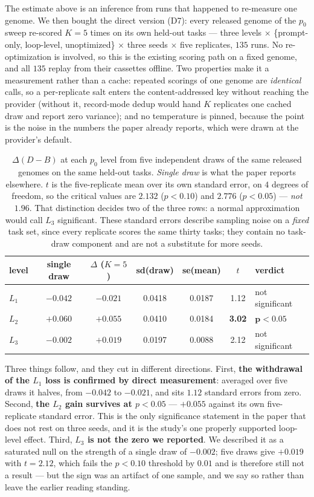 \documentclass[11pt]{article}
\newcommand{\dd}{\ensuremath{\Delta}}
\begin{document}
The estimate above is an inference from runs that happened to re-measure one genome. We then
bought the direct version (D7): every released genome of the $p_0$ sweep re-scored $K=5$ times
on its own held-out tasks --- three levels $\times$ \{prompt-only, loop-level, unoptimized\}
$\times$ three seeds $\times$ five replicates, $135$ runs. No re-optimization is involved, so
this is the existing scoring path on a fixed genome, and all $135$ replay from their cassettes
offline. Two properties make it a measurement rather than a cache: repeated scorings of one
genome are \emph{identical} calls, so a per-replicate salt enters the content-addressed key
without reaching the provider (without it, record-mode dedup would hand $K$ replicates one
cached draw and report zero variance); and no temperature is pinned, because the point is the
noise in the numbers the paper already reports, which were drawn at the provider's default.

\begin{table}[h]
\centering
\small
\begin{tabular}{lcccccl}
\toprule
level & single draw & $\dd$ ($K{=}5$) & sd(draw) & se(mean) & $t$ & verdict \\
\midrule
$L_1$ & $-0.042$ & $-0.021$ & 0.0418 & 0.0187 & 1.12 & not significant \\
$L_2$ & $+0.060$ & $+0.055$ & 0.0410 & 0.0184 & \textbf{3.02} & $\mathbf{p < 0.05}$ \\
$L_3$ & $-0.002$ & $+0.019$ & 0.0197 & 0.0088 & 2.12 & not significant \\
\bottomrule
\end{tabular}
\caption{$\dd(D-B)$ at each $p_0$ level from five independent draws of the same released
genomes on the same held-out tasks. \emph{Single draw} is what the paper reports elsewhere.
$t$ is the five-replicate mean over its own standard error, on $4$ degrees of freedom, so the
critical values are $2.132$ ($p<0.10$) and $2.776$ ($p<0.05$) --- \emph{not} $1.96$. That
distinction decides two of the three rows: a normal approximation would call $L_3$ significant.
These standard errors describe sampling noise on a \emph{fixed} task set, since every replicate
scores the same thirty tasks; they contain no task-draw component and are not a substitute for
more seeds.}
\label{tab:repeat}
\end{table}

Three things follow, and they cut in different directions. First, \textbf{the withdrawal of the
$L_1$ loss is confirmed by direct measurement}: averaged over five draws it halves, from
$-0.042$ to $-0.021$, and sits $1.12$ standard errors from zero. Second, \textbf{the $L_2$ gain
survives at $p<0.05$} --- $+0.055$ against its own five-replicate standard error. This is the
only significance statement in the paper that does not rest on three seeds, and it is the
study's one properly supported loop-level effect. Third, \textbf{$L_3$ is not the zero we
reported}. We described it as a saturated null on the strength of a single draw of $-0.002$;
five draws give $+0.019$ with $t=2.12$, which fails the $p<0.10$ threshold by $0.01$ and is
therefore still not a result --- but the sign was an artifact of one sample, and we say so
rather than leave the earlier reading standing.
\end{document}

